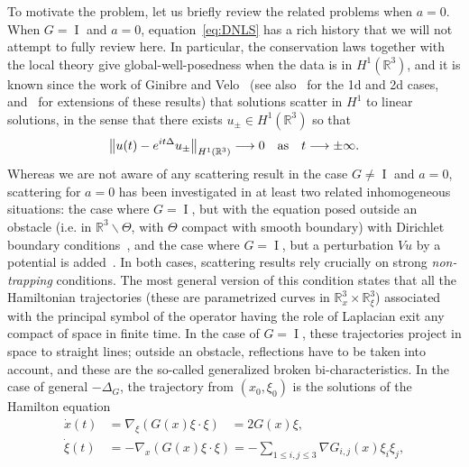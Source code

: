 \documentclass[AHL,Unicode,longabstracts,published]{cedram}
\newcommand*\R{\mathbb{R}}
\DeclareMathOperator{\I}{I}
\renewcommand*{\to}{\mathchoice{\longrightarrow}{\rightarrow}{\rightarrow}{\rightarrow}}
\begin{document}
To motivate the problem, let us briefly review the related problems when $a=0$. When $G = \I$ and $a = 0$, equation~\eqref{eq:DNLS} has a rich history that we will not attempt to fully review here. In particular, the conservation laws together with the local theory give global-well-posedness when the data is in $H^1(\R^3)$, and it is known since the work of Ginibre and Velo~\cite{GV85scat} (see also~\cite{Naka} for the 1d and 2d cases, and~\cite{Vi09} for extensions of these results) that solutions scatter in $H^1$ to linear solutions, in the sense that there exists $u_\pm \in H^1(\R^3)$ so that
\[
\left\| u(t) - e^{it\Delta} u_\pm \right\|_{H^1(\R^3)} \to 0 \quad\text{as}\quad t \to \pm\infty.
\]
Whereas we are not aware of any scattering result in the case $G \neq \I$ and $a=0$, scattering for $a=0$ has been investigated in at least two related inhomogeneous situations: the case where $G = \I$, but with the equation posed outside an obstacle (i.e. in $\R^3 \backslash \Theta$, with $\Theta$ compact with smooth boundary) with Dirichlet boundary conditions~\cite{Ab15,IvPl10, KiViXi16a, KiViXi16b,PV1,PV2,BiTeQi22}, and the case where $G = \I$, but a perturbation $Vu$ by a potential is added~\cite{BaVi16,FoVi18, Ho16, La16}. In both cases, scattering results rely crucially on strong \emph{non-trapping} conditions. The most general version of this condition states that all the Hamiltonian trajectories (these are parametrized curves in $\R_x^3 \times \R_\xi^3$) associated with the principal symbol of the operator having the role of Laplacian exit any compact of space in finite time. In the case of $G=\I$, these trajectories project in space to straight lines; outside an obstacle, reflections have to be taken into account, and these are the so-called generalized broken bi-characteristics. In the case of general $-\Delta_G$, the trajectory from $(x_0, \xi_0)$ is the solutions of the Hamilton equation
\begin{equation}\label{eq:Ham}
\begin{split}
\dot x(t) &= \nabla_\xi(G(x) \xi \cdot \xi) \;\;\;= 2 G(x) \xi, \\
\dot \xi(t) &= - \nabla_{x} (G(x) \xi \cdot \xi) = - \sum_{1\leq i, j \leq 3} \nabla G_{i,j}(x) \xi_i \xi_j,
\end{split}
\end{equation}
\end{document}
